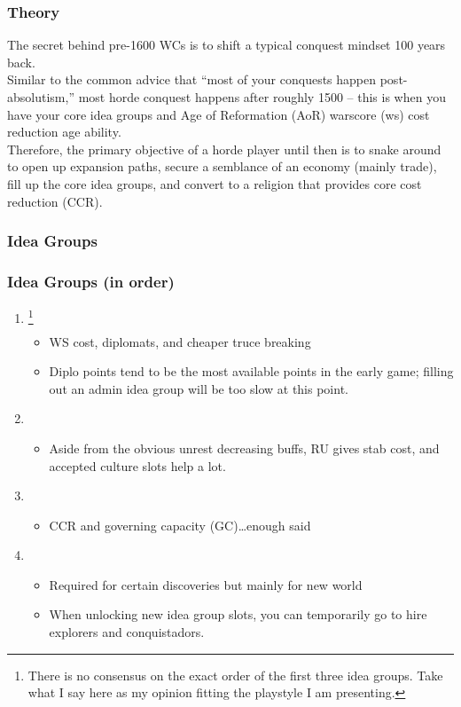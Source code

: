 \begin{frame}
  \frametitle{Theory}
  The secret behind pre-1600 WCs is to shift a typical conquest mindset 100
  years back.
  \\
  Similar to the common advice that ``most of your conquests happen
  post-absolutism,'' most horde conquest happens after roughly 1500 -- this
  is when you have your core idea groups and Age of Reformation (AoR) warscore
  (ws) cost reduction age ability.
  \\
  Therefore, the primary objective of a horde player until then is to snake
  around to open up expansion paths, secure a semblance of an economy (mainly
  trade), fill up the core idea groups, and convert to a religion that provides
  core cost reduction (CCR).
\end{frame}

\subsubsection{Idea Groups}
\begin{frame}
  \frametitle{Idea Groups (in order)}
  \begin{enumerate}
    \item {}\footnote{There is no consensus on the exact
        order of the first three idea groups. Take what I say here as my
      opinion fitting the playstyle I am presenting.}
      \begin{itemize}
        \item WS cost, diplomats, and cheaper truce breaking
        \item Diplo points tend to be the most available points in the early
          game; filling out an admin idea group will be too slow at this point.
      \end{itemize}
    \item {}
      \begin{itemize}
        \item Aside from the obvious unrest decreasing buffs, RU gives stab
          cost, and accepted culture slots help a lot.
      \end{itemize}
    \item {}
      \begin{itemize}
        \item CCR and governing capacity (GC)\ldots enough said
      \end{itemize}
    \item {}
      \begin{itemize}
        \item Required for certain discoveries but mainly for new world
        \item When unlocking new idea group slots, you can temporarily go
           to hire explorers and conquistadors.
      \end{itemize}
  \end{enumerate}
\end{frame}
